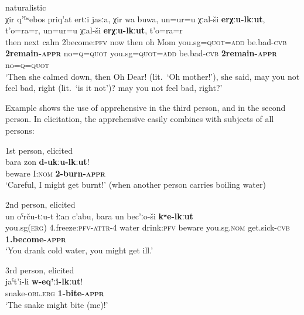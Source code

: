 \documentclass[output=paper,colorlinks,citecolor=brown]{langscibook}
\begin{document}
\ea \label{ex:DD2} \textnormal{naturalistic} \\
\gll χir q'ˁʷebos priq'at e{\textlangle}r{\textrangle}tːi jasːa, χir wa buwa, un=ur=u χːal-ši \textbf{e{\textlangle}r{\textrangle}χːu-lkːut}, t'o=ra=r, un=ur=u χːal-ši \textbf{e{\textlangle}r{\textrangle}χːu-lkːut}, t'o=ra=r  \\
then next calm {\textlangle}2{\textrangle}become:\textsc{pfv} now then oh Mom you.sg\textsc{=quot=add} be.bad-\textsc{cvb} \textbf{{\textlangle}2{\textrangle}remain\textsc{-appr}} no=\textsc{q=quot} you.sg\textsc{=quot=add} be.bad-\textsc{cvb} \textbf{{\textlangle}2{\textrangle}remain\textsc{-appr}} no=\textsc{q=quot} \\
\glt `Then she calmed down, then Oh Dear! (lit.\ `Oh mother!'), she said, may you not feel bad, right (lit.\ `is it not')? may you not feel bad, right?'
\z

 Example  shows the use of apprehensive in the third person, and  in the second person. In elicitation, the apprehensive easily combines with subjects of all persons:
 
\ea \label{ex:DD3} \textnormal{1st person, elicited} \\
\gll bara zon \textbf{d-ukːu-lkːut}! \\
beware I:\textsc{nom} \textbf{2-burn-\textsc{appr}} \\
\glt `Careful, I might get burnt!' (when another person carries boiling water)
\z

\ea \label{ex:DD4} \textnormal{2nd person, elicited} \\
\gll un oˁrču-tːu-t ɬːan c'abu, bara un bec'ːo-ši \textbf{kʷe-lkːut} \\
you.sg\textsc{(erg)} 4.freeze:\textsc{pfv-attr-4} water drink:\textsc{pfv} beware you.sg\textsc{.nom} get.sick-\textsc{cvb} \textbf{1.become-\textsc{appr}} \\
\glt `You drank cold water, you might get ill.'
\z

\ea \label{ex:DD5} \textnormal{3rd person, elicited}\\
\gll jaˁt'i-li \textbf{w-eq'ːi-lkːut}! \\
snake-\textsc{obl.erg} \textbf{1-bite-\textsc{appr}} \\
\glt `The snake might bite (me)!'
\z
\end{document}
